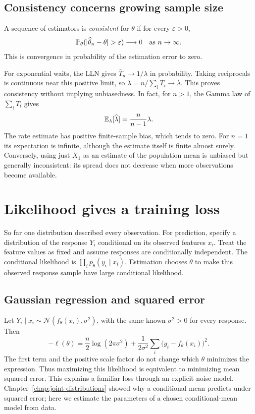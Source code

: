 \subsection{Consistency concerns growing sample size}

\begin{definition}[Consistency]
A sequence of estimators is \emph{consistent} for \(\theta\) if for every
\(\varepsilon>0\),
\[
  \Prob_\theta(|\widehat\theta_n-\theta|>\varepsilon)\longrightarrow0
  \quad\text{as }n\to\infty.
\]
This is convergence in probability of the estimation error to zero.
\end{definition}

For exponential waits, the LLN gives \(\bar T_n\to1/\lambda\) in
probability. Taking reciprocals is continuous near this positive limit,
so \(\widehat\lambda=n/\sum_iT_i\to\lambda\). This proves consistency
without implying unbiasedness. In fact, for \(n>1\), the Gamma law of
\(\sum_iT_i\) gives
\[
  \mathbb{E}_\lambda[\widehat\lambda]=\frac n{n-1}\lambda.
\]
The rate estimate has positive finite-sample bias, which tends to zero.
For \(n=1\) its expectation is infinite, although the estimate itself is
finite almost surely. Conversely, using just \(X_1\) as an estimate of
the population mean is unbiased but generally inconsistent: its spread
does not decrease when more observations become available.

\section{Likelihood gives a training loss}
\label{sec:likelihood-loss}

So far one distribution described every observation. For prediction, specify
a distribution of the response \(Y_i\) conditional on its observed features
\(x_i\). Treat the feature values as fixed and assume responses are
conditionally independent. The conditional likelihood is
\(\prod_i p_\theta(y_i\mid x_i)\). Estimation chooses \(\theta\) to make
this observed response sample have large conditional likelihood.

\subsection{Gaussian regression and squared error}

Let \(Y_i\mid x_i\sim\mathcal N(f_\theta(x_i),\sigma^2)\), with the
same known \(\sigma^2>0\) for every response. Then
\begin{equation}
  -\ell(\theta)=\frac n2\log(2\pi\sigma^2)
     +\frac1{2\sigma^2}\sum_i\bigl(y_i-f_\theta(x_i)\bigr)^2.
  \label{eq:gaussian-regression-loss}
\end{equation}
The first term and the positive scale factor do not change which
\(\theta\) minimizes the expression. Thus maximizing this likelihood is
equivalent to minimizing mean squared error. This explains a familiar loss
through an explicit noise model. Chapter~\ref{chap:joint-distributions}
showed why a conditional mean predicts under squared error; here we estimate
the parameters of a chosen conditional-mean model from data.

